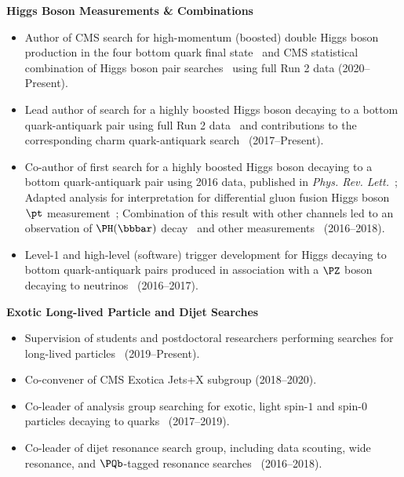 \documentclass[11pt]{res}
\begin{document}
\begin{resume}
  \textbf{Higgs Boson Measurements \& Combinations}
  \begin{itemize}
    \itemsep-0.3em
    \item Author of CMS search for high-momentum (boosted) double Higgs boson production in the four bottom quark final state~\cite{CMS:2022nmn} and CMS statistical combination of Higgs boson pair searches~\cite{CMS:2022dwd} using full Run 2 data ({2020--Present}).
    \item Lead author of search for a highly boosted Higgs boson decaying to a bottom quark-antiquark pair using full Run 2 data~\cite{Sirunyan:2020hwz} and contributions to the corresponding charm quark-antiquark search~\cite{CMS-PAS-HIG-21-012} ({2017--Present}).
    \item Co-author of first search for a highly boosted Higgs boson decaying to a bottom quark-antiquark pair using 2016 data, published in \emph{Phys. Rev. Lett.}~\cite{Sirunyan:2017dgc}; Adapted analysis for interpretation for differential gluon fusion Higgs boson $\pt$ measurement~\cite{Sirunyan:2018sgc}; Combination of this result with other channels led to an observation of $\PH(\bbbar)$ decay~\cite{Sirunyan:2018kst} and other measurements~\cite{Sirunyan:2018koj} ({2016--2018}).
    \item Level-1 and high-level (software) trigger development for Higgs decaying to bottom quark-antiquark pairs produced in association with a $\PZ$ boson decaying to neutrinos~\cite{Sirunyan:2018kst} ({2016--2017}).
  \end{itemize}

  \textbf{Exotic Long-lived Particle and Dijet Searches}
  \begin{itemize}
    \itemsep-0.3em
    \item Supervision of students and postdoctoral researchers performing searches for long-lived particles~\cite{CMS:2021yhb,CMS:2021juv} ({2019--Present}).
    \item Co-convener of CMS Exotica Jets+X subgroup ({2018--2020}).
    \item Co-leader of analysis group searching for exotic, light spin-$1$ and spin-$0$ particles decaying to quarks~\cite{Sirunyan:2019vxa,Sirunyan:2019sgo,Sirunyan:2018ikr,Sirunyan:2017nvi} ({2017--2019}).
    \item Co-leader of dijet resonance search group, including data scouting, wide resonance, and $\PQb$-tagged resonance searches~\cite{Sirunyan:2019pnb,Sirunyan:2019vgj,CMS-PAS-EXO-17-026,Duarte:2018bsd,Sirunyan:2018xlo,Sirunyan:2016iap} ({2016--2018}).
  \end{itemize}


\end{resume}
\end{document}
